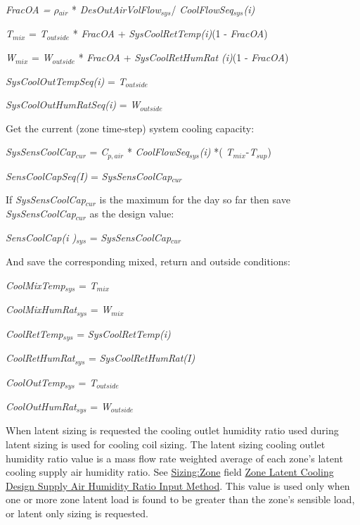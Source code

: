 \emph{FracOA = $\rho$\(_{air}\)} * \emph{DesOutAirVolFlow\(_{sys}\)}/ \emph{CoolFlowSeq\(_{sys}\)(i)}

\emph{T\(_{mix}\)} = \emph{T\(_{outside}\)} * \emph{FracOA} + \emph{SysCoolRetTemp(i)}(1 - \emph{FracOA})

\emph{W\(_{mix}\)} = \emph{W\(_{outside}\)} * \emph{FracOA} + \emph{SysCoolRetHumRat (i)}(1 - \emph{FracOA})

\emph{SysCoolOutTempSeq(i)} = \emph{T\(_{outside}\)}

\emph{SysCoolOutHumRatSeq(i)} = \emph{W\(_{outside}\)}

Get the current (zone time-step) system cooling capacity:

\emph{SysSensCoolCap\(_{cur}\)} = \emph{C\(_{p,air}\)} * \emph{CoolFlowSeq\(_{sys}\)(i)} *( \emph{T\(_{mix}\)}-\emph{T\(_{sup}\)})

\emph{SensCoolCapSeq(I)} = \emph{SysSensCoolCap\(_{cur}\)}

If \emph{SysSensCoolCap\(_{cur}\)} is the maximum for the day so far then save \emph{SysSensCoolCap\(_{cur}\)} as the design value:

\emph{SensCoolCap(i )\(_{sys}\)} = \emph{SysSensCoolCap\(_{cur}\)}

And save the corresponding mixed, return and outside conditions:

\emph{CoolMixTemp\(_{sys}\)} = \emph{T\(_{mix}\)}

\emph{CoolMixHumRat\(_{sys}\)} = \emph{W\(_{mix}\)}

\emph{CoolRetTemp\(_{sys}\)} = \emph{SysCoolRetTemp(i)}

\emph{CoolRetHumRat\(_{sys}\)} = \emph{SysCoolRetHumRat(I)}

\emph{CoolOutTemp\(_{sys}\)} = \emph{T\(_{outside}\)}

\emph{CoolOutHumRat\(_{sys}\)} = \emph{W\(_{outside}\)}

When latent sizing is requested the cooling outlet humidity ratio used during latent sizing is used for cooling coil sizing. The latent sizing cooling outlet humidity ratio value is a mass flow rate weighted average of each zone's latent cooling supply air humidity ratio. See \hyperref[sizingzone]{Sizing:Zone} field \hyperref[field-zone-latent-cooling-design-supply-air-humidity-ratio-input-method]{Zone Latent Cooling Design Supply Air Humidity Ratio Input Method}. This value is used only when one or more zone latent load is found to be greater than the zone's sensible load, or latent only sizing is requested.

